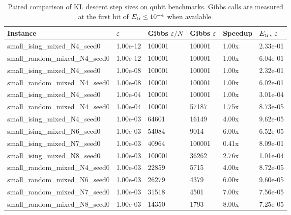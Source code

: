 \begin{table}
\caption{Paired comparison of KL descent step sizes on qubit benchmarks. Gibbs calls are measured at the first hit of $E_{\rm tr}\le 10^{-4}$ when available.}
\label{tab:kl-stepsize}
\begin{tabular}{llllll}
\toprule
Instance & $\varepsilon$ & Gibbs $\varepsilon/N$ & Gibbs $\varepsilon$ & Speedup & $E_{\rm tr}$, $\varepsilon$ \\
\midrule
small_ising_mixed_N4_seed0 & 1.00e-12 & 100001 & 100001 & 1.00x & 2.33e-01 \\
small_random_mixed_N4_seed0 & 1.00e-12 & 100001 & 100001 & 1.00x & 6.04e-01 \\
small_ising_mixed_N4_seed0 & 1.00e-08 & 100001 & 100001 & 1.00x & 2.32e-01 \\
small_random_mixed_N4_seed0 & 1.00e-08 & 100001 & 100001 & 1.00x & 6.02e-01 \\
small_ising_mixed_N4_seed0 & 1.00e-04 & 100001 & 100001 & 1.00x & 3.01e-04 \\
small_random_mixed_N4_seed0 & 1.00e-04 & 100001 & 57187 & 1.75x & 8.73e-05 \\
small_ising_mixed_N4_seed0 & 1.00e-03 & 64601 & 16149 & 4.00x & 9.62e-05 \\
small_ising_mixed_N6_seed0 & 1.00e-03 & 54084 & 9014 & 6.00x & 6.52e-05 \\
small_ising_mixed_N7_seed0 & 1.00e-03 & 40964 & 100001 & 0.41x & 8.09e-01 \\
small_ising_mixed_N8_seed0 & 1.00e-03 & 100001 & 36262 & 2.76x & 1.01e-04 \\
small_random_mixed_N4_seed0 & 1.00e-03 & 22859 & 5715 & 4.00x & 8.72e-05 \\
small_random_mixed_N6_seed0 & 1.00e-03 & 26279 & 4379 & 6.00x & 9.60e-05 \\
small_random_mixed_N7_seed0 & 1.00e-03 & 31518 & 4501 & 7.00x & 7.56e-05 \\
small_random_mixed_N8_seed0 & 1.00e-03 & 14350 & 1793 & 8.00x & 7.25e-05 \\
\bottomrule
\end{tabular}
\end{table}
